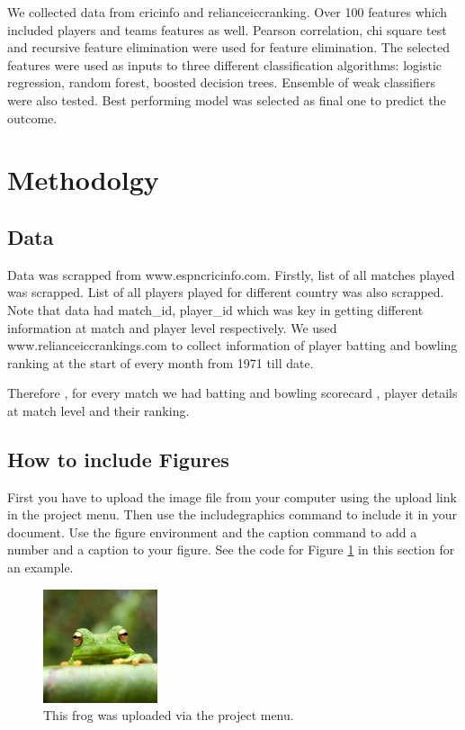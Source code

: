 \documentclass[a4paper]{article}
\begin{document}
We collected data from cricinfo and relianceiccranking. Over 100 features which included players and teams features as well.  Pearson correlation, chi square test and recursive feature elimination were used for feature elimination. The selected features were used as inputs to three different classification algorithms: logistic regression,
random forest, boosted decision trees. Ensemble of weak classifiers were also tested. Best performing model was selected as final one to predict the outcome.


\section{Methodolgy}

\subsection{Data}

Data was scrapped from www.espncricinfo.com. Firstly, list of all matches played was scrapped.  List of all players played for different country was also scrapped. Note that data had match\_id, player\_id which was key in getting different information
at match and player level respectively. We used www.relianceiccrankings.com to collect information of player batting and bowling ranking at the start of every month from 1971 till date. 

Therefore , for every match we had batting and bowling scorecard , player details at match level and their ranking. 



\subsection{How to include Figures}

First you have to upload the image file from your computer using the upload link in the project menu. Then use the includegraphics command to include it in your document. Use the figure environment and the caption command to add a number and a caption to your figure. See the code for Figure \ref{fig:frog} in this section for an example.

\begin{figure}
\centering
\includegraphics[width=0.3\textwidth]{frog.jpg}
\caption{\label{fig:frog}This frog was uploaded via the project menu.}
\end{figure}
\end{document}

